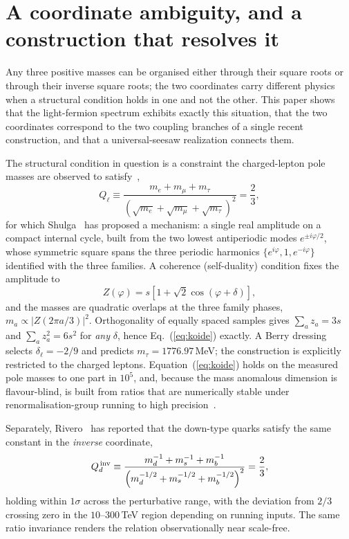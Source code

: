 \documentclass[11pt]{article}
\begin{document}
\section{A coordinate ambiguity, and a construction that resolves it}

Any three positive masses can be organised either through their square roots or
through their inverse square roots; the two coordinates carry different physics
when a structural condition holds in one and not the other. This paper shows
that the light-fermion spectrum exhibits exactly this situation, that the two
coordinates correspond to the two coupling branches of a single recent
construction, and that a universal-seesaw realization connects them.

The structural condition in question is a constraint the charged-lepton pole
masses are observed to satisfy~\cite{Koide1982,Koide1983,PDG},
\begin{equation}
Q_\ell \equiv \frac{m_e+m_\mu+m_\tau}{\left(\sqrt{m_e}+\sqrt{m_\mu}+\sqrt{m_\tau}\right)^2}
= \frac{2}{3},
\label{eq:koide}
\end{equation}
for which Shulga~\cite{Shulga2026} has
proposed a mechanism: a single real amplitude on a compact internal cycle, built
from the two lowest antiperiodic modes $e^{\pm i\varphi/2}$, whose symmetric square
spans the three periodic harmonics $\{e^{i\varphi},1,e^{-i\varphi}\}$ identified
with the three families. A coherence (self-duality) condition fixes the amplitude to
\begin{equation}
Z(\varphi) = s\left[1+\sqrt{2}\cos(\varphi+\delta)\right],
\label{eq:Z}
\end{equation}
and the masses are quadratic overlaps at the three family phases,
$m_a \propto |Z(2\pi a/3)|^2$. Orthogonality of equally spaced samples gives
$\sum_a z_a = 3s$ and $\sum_a z_a^2 = 6s^2$ for \emph{any} $\delta$, hence
Eq.~(\ref{eq:koide}) exactly. A Berry dressing selects $\delta_\ell = -2/9$ and
predicts $m_\tau = 1776.97$\,MeV; the construction is explicitly restricted to
the charged leptons. Equation~(\ref{eq:koide}) holds on the measured pole
masses to one part in $10^5$, and, because the mass anomalous dimension is
flavour-blind, is built from ratios that are numerically stable under renormalisation-group running to high precision~\cite{LiMa}.

Separately, Rivero~\cite{Rivero2026} has reported that the down-type quarks satisfy
the same constant in the \emph{inverse} coordinate,
\begin{equation}
Q_d^{\,\rm inv} \equiv
\frac{m_d^{-1}+m_s^{-1}+m_b^{-1}}{\left(m_d^{-1/2}+m_s^{-1/2}+m_b^{-1/2}\right)^2}
= \frac{2}{3},
\label{eq:rivero}
\end{equation}
holding within $1\sigma$ across the perturbative range, with the deviation from
$2/3$ crossing zero in the $10$--$300$\,TeV region depending on running inputs.
The same ratio invariance renders the relation observationally near
scale-free.
\end{document}
